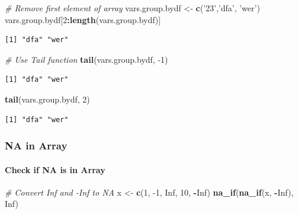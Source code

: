 \documentclass[
]{book}
\newenvironment{Shaded}{\begin{snugshade}}{\end{snugshade}}
\newcommand{\CommentTok}[1]{\textcolor[rgb]{0.56,0.35,0.01}{\textit{#1}}}
\newcommand{\DecValTok}[1]{\textcolor[rgb]{0.00,0.00,0.81}{#1}}
\newcommand{\KeywordTok}[1]{\textcolor[rgb]{0.13,0.29,0.53}{\textbf{#1}}}
\newcommand{\NormalTok}[1]{#1}
\newcommand{\OperatorTok}[1]{\textcolor[rgb]{0.81,0.36,0.00}{\textbf{#1}}}
\newcommand{\OtherTok}[1]{\textcolor[rgb]{0.56,0.35,0.01}{#1}}
\newcommand{\StringTok}[1]{\textcolor[rgb]{0.31,0.60,0.02}{#1}}
\begin{document}
\begin{Shaded}
\begin{Highlighting}[]
\CommentTok{# Remove first element of array}
\NormalTok{vars.group.bydf <-}\StringTok{ }\KeywordTok{c}\NormalTok{(}\StringTok{'23'}\NormalTok{,}\StringTok{'dfa'}\NormalTok{, }\StringTok{'wer'}\NormalTok{)}
\NormalTok{vars.group.bydf[}\DecValTok{2}\OperatorTok{:}\KeywordTok{length}\NormalTok{(vars.group.bydf)]}
\end{Highlighting}
\end{Shaded}

\begin{verbatim}
[1] "dfa" "wer"
\end{verbatim}

\begin{Shaded}
\begin{Highlighting}[]
\CommentTok{# Use Tail function}
\KeywordTok{tail}\NormalTok{(vars.group.bydf, }\DecValTok{-1}\NormalTok{)}
\end{Highlighting}
\end{Shaded}

\begin{verbatim}
[1] "dfa" "wer"
\end{verbatim}

\begin{Shaded}
\begin{Highlighting}[]
\KeywordTok{tail}\NormalTok{(vars.group.bydf, }\DecValTok{2}\NormalTok{)}
\end{Highlighting}
\end{Shaded}

\begin{verbatim}
[1] "dfa" "wer"
\end{verbatim}

\hypertarget{na-in-array}{%
\subsubsection{NA in Array}\label{na-in-array}}

\hypertarget{check-if-na-is-in-array}{%
\paragraph{Check if NA is in Array}\label{check-if-na-is-in-array}}

\begin{Shaded}
\begin{Highlighting}[]
\CommentTok{# Convert Inf and -Inf to NA}
\NormalTok{x <-}\StringTok{ }\KeywordTok{c}\NormalTok{(}\DecValTok{1}\NormalTok{, }\DecValTok{-1}\NormalTok{, }\OtherTok{Inf}\NormalTok{, }\DecValTok{10}\NormalTok{, }\OperatorTok{-}\OtherTok{Inf}\NormalTok{)}
\KeywordTok{na_if}\NormalTok{(}\KeywordTok{na_if}\NormalTok{(x, }\OperatorTok{-}\OtherTok{Inf}\NormalTok{), }\OtherTok{Inf}\NormalTok{)}
\end{Highlighting}
\end{Shaded}
\end{document}
